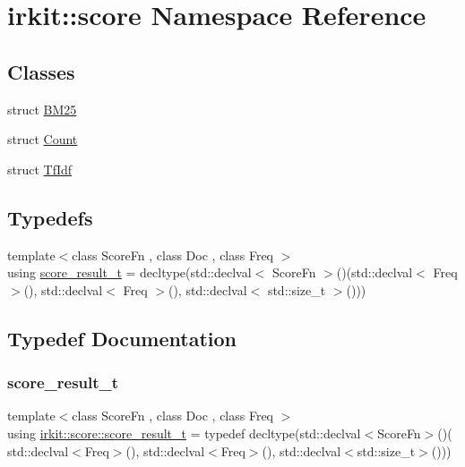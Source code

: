 \hypertarget{namespaceirkit_1_1score}{}\section{irkit\+:\+:score Namespace Reference}
\label{namespaceirkit_1_1score}
\subsection*{Classes}
\begin{DoxyCompactItemize}
\item 
struct \hyperlink{structirkit_1_1score_1_1BM25}{B\+M25}
\item 
struct \hyperlink{structirkit_1_1score_1_1Count}{Count}
\item 
struct \hyperlink{structirkit_1_1score_1_1TfIdf}{Tf\+Idf}
\end{DoxyCompactItemize}
\subsection*{Typedefs}
\begin{DoxyCompactItemize}
\item 
{\footnotesize template$<$class Score\+Fn , class Doc , class Freq $>$ }\\using \hyperlink{namespaceirkit_1_1score_ab6226695d6d5c54c84fcf2cb8e90c8b3}{score\+\_\+result\+\_\+t} = decltype(std\+::declval$<$ Score\+Fn $>$()(std\+::declval$<$ Freq $>$(), std\+::declval$<$ Freq $>$(), std\+::declval$<$ std\+::size\+\_\+t $>$()))
\end{DoxyCompactItemize}


\subsection{Typedef Documentation}
\mbox{\label{namespaceirkit_1_1score_ab6226695d6d5c54c84fcf2cb8e90c8b3}} 
\subsubsection{\texorpdfstring{score\+\_\+result\+\_\+t}{score\_result\_t}}
{\footnotesize\ttfamily template$<$class Score\+Fn , class Doc , class Freq $>$ \\
using \hyperlink{namespaceirkit_1_1score_ab6226695d6d5c54c84fcf2cb8e90c8b3}{irkit\+::score\+::score\+\_\+result\+\_\+t} = typedef decltype(std\+::declval$<$Score\+Fn$>$()( std\+::declval$<$Freq$>$(), std\+::declval$<$Freq$>$(), std\+::declval$<$std\+::size\+\_\+t$>$()))}

